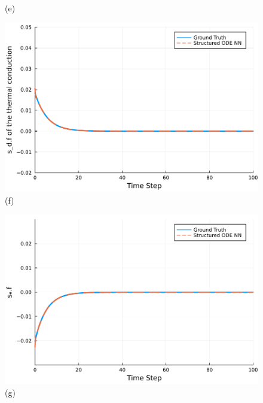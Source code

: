 \documentclass[
	parskip, 			   %
	twoside, 			   %
	DIV=14, 			   %
	BCOR=15.0mm, 		   %
	headsepline, 		   %
	open=right, 		   %
	captions=tableheading, %
	bibliography=totoc,    %
	numbers=noenddot       %
]{scrreprt}
\begin{document}
\begin{figure}[h!]
\begin{minipage}{.3\textwidth}
    \\(e)
    \end{minipage}%
    \begin{minipage}{.3\textwidth}
    \centering
    \includegraphics[width=1\linewidth]{figures/sd_tc.f_compositional_ndho_with_EPHS_structure.pdf}
    \\(f)
    \end{minipage}
    \begin{minipage}{.3\textwidth}
    \centering
    \includegraphics[width=1\linewidth]{figures/se.f_compositional_ndho_with_EPHS_structure.pdf}
    \\(g)
    \end{minipage}%
    \begin{minipage}{.3\textwidth}
    \centering

\end{minipage}
\end{figure}
\end{document}
